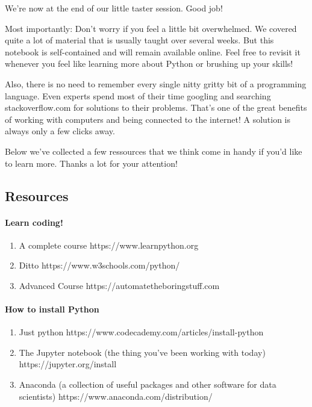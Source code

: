 \documentclass[11pt]{article}
\providecommand{\tightlist}{%
      \setlength{\itemsep}{0pt}\setlength{\parskip}{0pt}}
\begin{document}
    We're now at the end of our little taster session. Good job!

Most importantly: Don't worry if you feel a little bit overwhelmed. We
covered quite a lot of material that is usually taught over several
weeks. But this notebook is self-contained and will remain available
online. Feel free to revisit it whenever you feel like learning more
about Python or brushing up your skills!

Also, there is no need to remember every single nitty gritty bit of a
programming language. Even experts spend most of their time googling and
searching stackoverflow.com for solutions to their problems. That's one
of the great benefits of working with computers and being connected to
the internet! A solution is always only a few clicks away.

Below we've collected a few ressources that we think come in handy if
you'd like to learn more. Thanks a lot for your attention!

    \subsection{Resources}\label{resources}

    \paragraph{Learn coding!}\label{learn-coding}

\begin{enumerate}
\def\labelenumi{\arabic{enumi}.}
\tightlist
\item
  A complete course https://www.learnpython.org
\item
  Ditto https://www.w3schools.com/python/
\item
  Advanced Course https://automatetheboringstuff.com
\end{enumerate}

    \paragraph{How to install Python}\label{how-to-install-python}

\begin{enumerate}
\def\labelenumi{\arabic{enumi}.}
\tightlist
\item
  Just python https://www.codecademy.com/articles/install-python
\item
  The Jupyter notebook (the thing you've been working with today)
  https://jupyter.org/install
\item
  Anaconda (a collection of useful packages and other software for data
  scientists) https://www.anaconda.com/distribution/
\end{enumerate}
\end{document}
